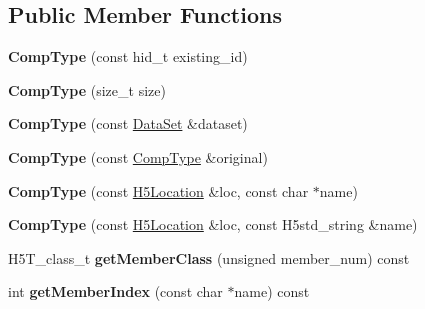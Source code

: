 \subsection*{Public Member Functions}
\begin{DoxyCompactItemize}
\item 
\mbox{\label{class_h5_1_1_comp_type_a5cad9616c8cc3320bb256bf4de7c1bbd}} 
{\bfseries Comp\+Type} (const hid\+\_\+t existing\+\_\+id)
\item 
\mbox{\label{class_h5_1_1_comp_type_ac2ad859ac5c8082158ca2db8c888106f}} 
{\bfseries Comp\+Type} (size\+\_\+t size)
\item 
\mbox{\label{class_h5_1_1_comp_type_ad928c3cb8ecffb34588c4f4558157250}} 
{\bfseries Comp\+Type} (const \hyperlink{class_h5_1_1_data_set}{Data\+Set} \&dataset)
\item 
\mbox{\label{class_h5_1_1_comp_type_a66842ec0c02ec8f674338d1abc89cf9c}} 
{\bfseries Comp\+Type} (const \hyperlink{class_h5_1_1_comp_type}{Comp\+Type} \&original)
\item 
\mbox{\label{class_h5_1_1_comp_type_a32f6f9d920546a64109c3563c9dec9fb}} 
{\bfseries Comp\+Type} (const \hyperlink{class_h5_1_1_h5_location}{H5\+Location} \&loc, const char $\ast$name)
\item 
\mbox{\label{class_h5_1_1_comp_type_a2cf6cb464bab71ac71696f22d5381e1d}} 
{\bfseries Comp\+Type} (const \hyperlink{class_h5_1_1_h5_location}{H5\+Location} \&loc, const H5std\+\_\+string \&name)
\item 
\mbox{\label{class_h5_1_1_comp_type_a8cd73bdec474d9f1018fa09e91258aeb}} 
H5\+T\+\_\+class\+\_\+t {\bfseries get\+Member\+Class} (unsigned member\+\_\+num) const
\item 
\mbox{\label{class_h5_1_1_comp_type_a5b7e8b7c9c0f5f99b07fe7764af4a450}} 
int {\bfseries get\+Member\+Index} (const char $\ast$name) const
\item 
\mbox{\label{class_h5_1_1_comp_type_ac7469e9774b9295b702ace113d4763de}} 

\end{DoxyCompactItemize}

